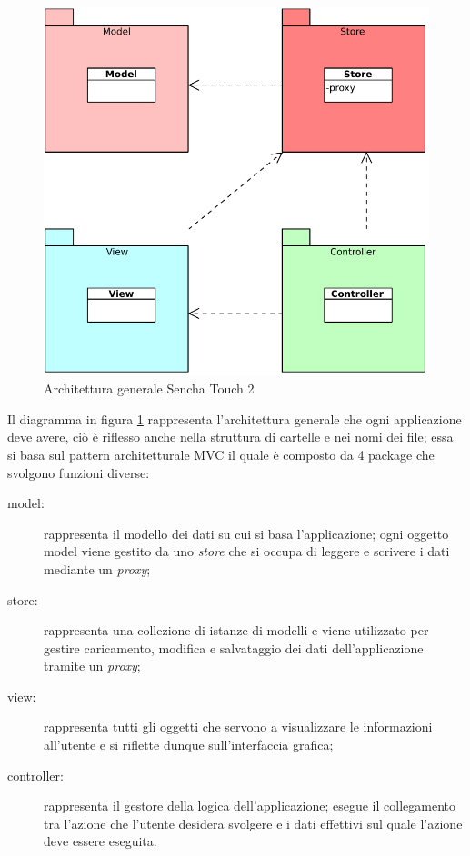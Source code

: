 \begin{figure}[htb]
\centering
\includegraphics[scale=0.6]{gfx/class/Sencha_Touch_2.pdf}
\caption{Architettura generale Sencha Touch 2}
\label{fig:architettura Sencha}
\end{figure}
Il diagramma in figura \ref{fig:architettura Sencha} rappresenta l'architettura generale che ogni applicazione deve avere, ciò è riflesso anche nella struttura di cartelle e nei nomi dei file; essa si basa sul pattern architetturale \ac{MVC} il quale è composto da 4 package che svolgono funzioni diverse:
\begin{description}
\item[model:] rappresenta il modello dei dati su cui si basa l'applicazione; ogni oggetto model viene gestito da uno \emph{store} che si occupa di leggere e scrivere i dati mediante un \emph{proxy};
\item[store:] rappresenta una collezione di istanze di modelli e viene utilizzato per gestire caricamento, modifica e salvataggio dei dati dell'applicazione tramite un \emph{proxy};
\item[view:] rappresenta tutti gli oggetti che servono a visualizzare le informazioni all'utente e si riflette dunque sull'interfaccia grafica;
\item[controller:] rappresenta il gestore della logica dell'applicazione; esegue il collegamento tra l'azione che l'utente desidera svolgere e i dati effettivi sul quale l'azione deve essere eseguita.
\end{description}

